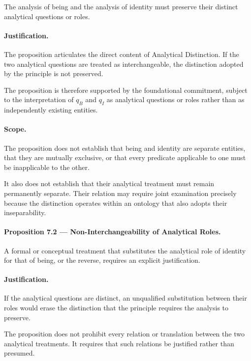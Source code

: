 The analysis of being and the analysis of identity must preserve
their distinct analytical questions or roles.

\paragraph{Justification.}

The proposition articulates the direct content of Analytical
Distinction. If the two analytical questions are treated as
interchangeable, the distinction adopted by the principle is
not preserved.

The proposition is therefore supported by the foundational
commitment, subject to the interpretation of \(q_B\) and
\(q_I\) as analytical questions or roles rather than as
independently existing entities.

\paragraph{Scope.}

The proposition does not establish that being and identity
are separate entities, that they are mutually exclusive, or
that every predicate applicable to one must be inapplicable
to the other.

It also does not establish that their analytical treatment
must remain permanently separate. Their relation may require
joint examination precisely because the distinction operates
within an ontology that also adopts their inseparability.

\paragraph{Proposition 7.2 — Non-Interchangeability of
Analytical Roles.}

A formal or conceptual treatment that substitutes the analytical
role of identity for that of being, or the reverse, requires
an explicit justification.

\paragraph{Justification.}

If the analytical questions are distinct, an unqualified
substitution between their roles would erase the distinction
that the principle requires the analysis to preserve.

The proposition does not prohibit every relation or translation
between the two analytical treatments. It requires that such
relations be justified rather than presumed.

